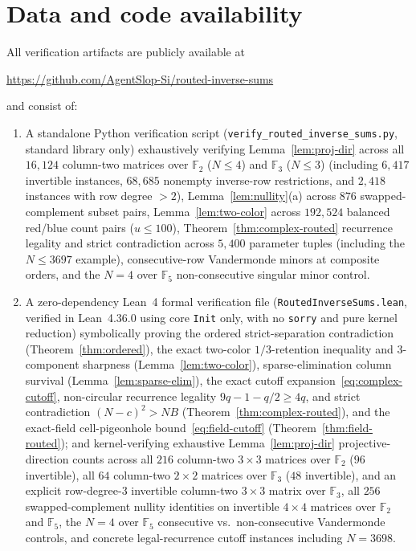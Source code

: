 \documentclass[11pt,reqno]{amsart}
\numberwithin{equation}{section}
\theoremstyle{definition}
\theoremstyle{remark}
\newcommand{\F}{\mathbb{F}}
\begin{document}
\section*{Data and code availability}
All verification artifacts are publicly available at
\begin{center}
\url{https://github.com/AgentSlop-Si/routed-inverse-sums}
\end{center}
and consist of:
\begin{enumerate}[label=(\arabic*),leftmargin=2em]
\item A standalone Python verification script (\texttt{verify\_routed\_inverse\_sums.py}, standard library only) exhaustively verifying Lemma~\ref{lem:proj-dir} across all $16{,}124$ column-two matrices over $\F_2$ ($N\le 4$) and $\F_3$ ($N\le 3$) (including $6{,}417$ invertible instances, $68{,}685$ nonempty inverse-row restrictions, and $2{,}418$ instances with row degree $>2$), Lemma~\ref{lem:nullity}(a) across $876$ swapped-complement subset pairs, Lemma~\ref{lem:two-color} across $192{,}524$ balanced red/blue count pairs ($u\le 100$), Theorem~\ref{thm:complex-routed} recurrence legality and strict contradiction across $5{,}400$ parameter tuples (including the $N\le 3697$ example), consecutive-row Vandermonde minors at composite orders, and the $N=4$ over $\F_5$ non-consecutive singular minor control.
\item A zero-dependency Lean~4 formal verification file (\texttt{RoutedInverseSums.lean}, verified in Lean~4.36.0 using core \texttt{Init} only, with no \texttt{sorry} and pure kernel reduction) symbolically proving the ordered strict-separation contradiction (Theorem~\ref{thm:ordered}), the exact two-color $1/3$-retention inequality and $3$-component sharpness (Lemma~\ref{lem:two-color}), sparse-elimination column survival (Lemma~\ref{lem:sparse-elim}), the exact cutoff expansion~\eqref{eq:complex-cutoff}, non-circular recurrence legality $9q - 1 - q/2 \ge 4q$, and strict contradiction $(N-c)^2 > NB$ (Theorem~\ref{thm:complex-routed}), and the exact-field cell-pigeonhole bound~\eqref{eq:field-cutoff} (Theorem~\ref{thm:field-routed}); and kernel-verifying exhaustive Lemma~\ref{lem:proj-dir} projective-direction counts across all $216$ column-two $3\times 3$ matrices over $\F_2$ ($96$ invertible), all $64$ column-two $2\times 2$ matrices over $\F_3$ ($48$ invertible), and an explicit row-degree-$3$ invertible column-two $3\times 3$ matrix over $\F_3$, all $256$ swapped-complement nullity identities on invertible $4\times 4$ matrices over $\F_2$ and $\F_5$, the $N=4$ over $\F_5$ consecutive vs.\ non-consecutive Vandermonde controls, and concrete legal-recurrence cutoff instances including $N=3698$.
\end{enumerate}



\end{document}
